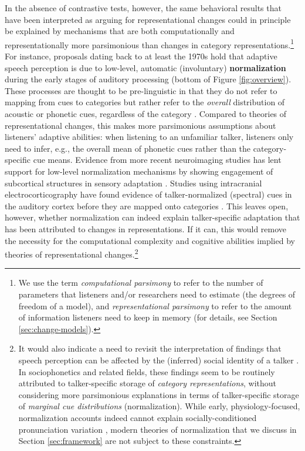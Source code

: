 \documentclass[
  11pt,
  man,floatsintext]{apa6}
\begin{document}
In the absence of contrastive tests, however, the same behavioral results that have been interpreted as arguing for representational changes could in principle be explained by mechanisms that are both computationally and representationally more parsimonious than changes in category representations.\footnote{We use the term \emph{computational parsimony} to refer to the number of parameters that listeners and/or researchers need to estimate (the degrees of freedom of a model), and \emph{representational parsimony} to refer to the amount of information listeners need to keep in memory (for details, see Section \ref{sec:change-models}).} For instance, proposals dating back to at least the 1970s hold that adaptive speech perception is due to low-level, automatic (involuntary) \textbf{normalization} during the early stages of auditory processing (bottom of Figure \ref{fig:overview}). These processes are thought to be pre-linguistic in that they do not refer to mapping from cues to categories but rather refer to the \emph{overall} distribution of acoustic or phonetic cues, regardless of the category \autocites[for reviews,][]{johnson-sjerps2021,stilp2020}. Compared to theories of representational changes, this makes more parsimonious assumptions about listeners' adaptive abilities: when listening to an unfamiliar talker, listeners only need to infer, e.g., the overall mean of phonetic cues rather than the category-specific cue means. Evidence from more recent neuroimaging studies has lent support for low-level normalization mechanisms by showing engagement of subcortical structures in sensory adaptation \autocites[e.g., the brain stem,][]{skoe2021auditory}[and cerebellum,][]{guediche2015evidence}[for review, see][]{guediche2014}. Studies using intracranial electrocorticography have found evidence of talker-normalized (spectral) cues in the auditory cortex before they are mapped onto categories \autocites[e.g.,][]{sjerps2019,Tang2017}. This leaves open, however, whether normalization can indeed explain talker-specific adaptation that has been attributed to changes in representations. If it can, this would remove the necessity for the computational complexity and cognitive abilities implied by theories of representational changes.\footnote{It would also indicate a need to revisit the interpretation of findings that speech perception can be affected by the (inferred) social identity of a talker \autocites[e.g., regional origin,][]{hay-drager2010,niedzielski1999}[sex,][]{johnson1999,strand1999}[age,][]{skoogwaller2015,walker-hay2011}[and individual identity,][]{nygaard1994,remez2018}. In sociophonetics and related fields, these findings seem to be routinely attributed to talker-specific storage of \emph{category representations}, without considering more parsimonious explanations in terms of talker-specific storage of \emph{marginal cue distributions} (normalization). While early, physiology-focused, normalization accounts indeed cannot explain socially-conditioned pronunciation variation \autocite[see, e.g.,][]{johnson2006}, modern theories of normalization that we discuss in Section \ref{sec:framework} are not subject to these constraints.}
\end{document}

